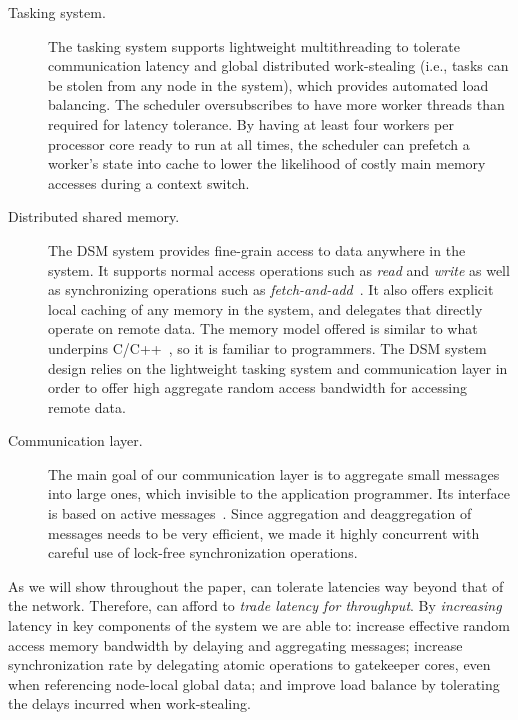 \begin{description}

\item [Tasking system.] The tasking system supports lightweight multithreading
to tolerate communication latency and global distributed work-stealing (i.e.,
tasks can be stolen from any node in the system), which provides automated
load balancing. The scheduler oversubscribes to have more worker threads than
required for latency tolerance. By having at least four workers per processor
core ready to run at all times, the scheduler can prefetch a worker's state
into cache to lower the likelihood of costly main memory accesses during a
context switch.

\item[Distributed shared memory.] The DSM system provides fine-grain access to
data anywhere in the system. It supports normal access operations such as
\emph{read\/} and \emph{write\/} as well as synchronizing operations such as
\emph{fetch-and-add\/}~\cite{fetchandadd}. It also offers explicit local
caching of any memory in the system, and delegates that directly operate on
remote data. The memory model offered is similar to what underpins
C/C++~\cite{N2480,N2800}, so it is familiar to programmers. The DSM system
design relies on the lightweight tasking system and communication layer in
order to offer high aggregate random access bandwidth for accessing remote
data.

\item[Communication layer.] The main goal of our communication layer is to
aggregate small messages into large ones, which invisible to the application
programmer. Its interface is based on active messages~\cite{vonEicken92}.
Since aggregation and deaggregation of messages needs to be very efficient, we
made it highly concurrent with careful use of lock-free synchronization
operations.


\end{description}

As we will show throughout the paper, \Grappa can tolerate latencies way beyond
that of the network. Therefore, \Grappa can afford to \emph{trade latency for
throughput}. By {\em increasing\/} latency in key components of the system we
are able to: increase effective random access memory bandwidth by delaying and
aggregating messages; increase synchronization rate by delegating atomic
operations to gatekeeper cores, even when referencing node-local global data;
and improve load balance by tolerating the delays incurred when work-stealing.

